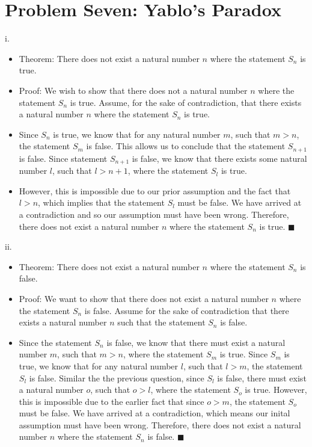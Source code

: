 \documentclass{article}
\renewcommand{\(}{\left(}
\renewcommand{\)}{\right)}
\theoremstyle{plain}
\theoremstyle{plain}
\theoremstyle{definition}
\begin{document}
\newpage

\section*{Problem Seven: Yablo's Paradox}
    i.
    \begin{shaded}
        \begin{itemize}
            \item 
                Theorem: There does not exist a natural number $n$ where the statement $S_{n}$ is true.
            \item 
                Proof: We wish to show that there does not a natural number $n$ where the statement $S_{n}$ is true. Assume, for the sake of contradiction, that there exists a natural number $n$ where the statement $S_{n}$ is true. 
            \item
                Since $S_{n}$ is true, we know that for any natural number $m$, such that $m>n$, the statement $S_{m}$ is false. This allows us to conclude that the statement $S_{n+1}$ is false. Since statement $S_{n+1}$ is false, we know that there exists some natural number $l$, such that $l>n+1$, where the statement $S_{l}$ is true.
            \item 
                However, this is impossible due to our prior assumption and the fact that $l>n$, which implies that the statement $S_{l}$ must be false. We have arrived at a contradiction and so our assumption must have been wrong. Therefore, there does not exist a natural number $n$ where the statement $S_{n}$ is true. $\blacksquare$
        \end{itemize}
    \end{shaded}
    
    ii.
    \begin{shaded}
        \begin{itemize}
            \item 
                Theorem: There does not exist a natural number $n$ where the statement $S_{n}$ is false.
            \item 
                Proof: We want to show that there does not exist a natural number $n$ where the statement $S_{n}$ is false. Assume for the sake of contradiction that there exists a natural number $n$ such that the statement $S_{n}$ is false.
            \item 
                Since the statement $S_{n}$ is false, we know that there must exist a natural number $m$, such that $m>n$, where the statement $S_{m}$ is true. Since $S_{m}$ is true, we know that for any natural number $l$, such that $l>m$, the statement $S_{l}$ is false. Similar the the previous question, since $S_{l}$ is false, there must exist a natural number $o$, such that $o>l$, where the statement $S_{o}$ is true. However, this is impossible due to the earlier fact that since $o>m$, the statement $S_{o}$ must be false. We have arrived at a contradiction, which means our inital assumption must have been wrong. Therefore, there does not exist a natural number $n$ where the statement $S_{n}$ is false. $\blacksquare$
        \end{itemize}
    \end{shaded}
    
\end{document}
